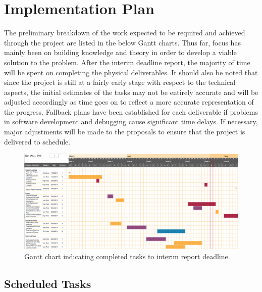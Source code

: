 \documentclass[10pt,onecolumn,letterpaper]{article}
\begin{document}

\section{Implementation Plan} %


The preliminary breakdown of the work expected to be required and achieved through the project are listed in the below Gantt charts. Thus far, focus has mainly been on building knowledge and theory in order to develop a viable solution to the problem. After the interim deadline report, the majority of time will be spent on completing the physical deliverables. It should also be noted that since the project is still at a fairly early stage with respect to the technical aspects, the initial estimates of the tasks may not be entirely accurate and will be adjusted accordingly as time goes on to reflect a more accurate representation of the progress. Fallback plans have been established for each deliverable if problems in software development and debugging cause significant time delays. If necessary, major adjustments will be made to the proposals to ensure that the project is delivered to schedule. 

\begin{figure}[!hbt!]
\centering
\includegraphics[width=17.5cm]{past_gantt.png}
\caption{Gantt chart indicating completed tasks to interim report deadline.}
\end{figure}

\subsection{Scheduled Tasks}
\end{document}
